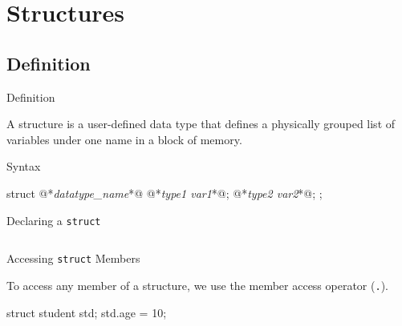 \documentclass[compress]{beamer}
\begin{document}
\prepareCover

\section{Structures}

\subsection{Definition}

\begin{slide}
	\begin{block}{Definition}

	A structure is a user-defined data type that defines a physically grouped list of variables under one name in a block of memory.

	\end{block}
\end{slide}

\begin{slide}
	\begin{block}{Syntax}

	\begin{terminal}
	struct @*\textit{datatype\_name}*@ {
	        @*\textit{type1 var1}*@;
	        @*\textit{type2 var2}*@;
	};
	\end{terminal}

	\end{block}
\end{slide}

\begin{slide}
	\begin{block}{Declaring a \texttt{struct}}

	\inputminted[fontsize=\scriptsize, firstline=10, linenos]{c}{
		\resDirectory/student.h
	}

	\end{block}
\end{slide}

\begin{slide}
	\begin{block}{Accessing \texttt{struct} Members}

	To access any member of a structure, we use the member access operator (\texttt{.}).

	\begin{terminal}
	struct student std;
	std.age = 10;
	\end{terminal}

	\end{block}
\end{slide}
\end{document}
